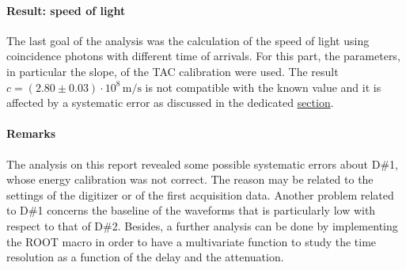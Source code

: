 \documentclass[a4paper]{article}
\begin{document}
\paragraph{Result: speed of light} The last goal of the analysis was the calculation of the speed of light using coincidence photons with different time of arrivals. For this part, the parameters, in particular the slope, of the TAC calibration were used. The result $c=(2.80\pm0.03)\cdot 10^8 \, \mathrm{m/s}$
 is not compatible with the known value and it is affected by a systematic error as discussed in the dedicated \hyperlink{2.4}{section}.
 
\paragraph{Remarks} The analysis on this report revealed some possible systematic errors about D\#1, whose energy calibration was not correct. The reason may be related to the settings of the digitizer or of the first acquisition data. Another problem related to D\#1 concerns the baseline of the waveforms that is particularly low with respect to that of D\#2. %
Besides, a further analysis can be done by implementing the ROOT macro in order to have a multivariate function %
to study the time resolution as a function of the delay and the attenuation.
\end{document}
